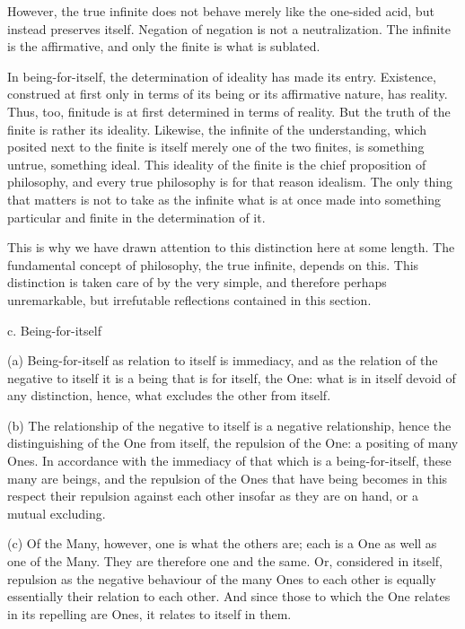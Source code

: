     However, the true infinite does not behave merely like
    the one-sided acid, but instead preserves itself.
    Negation of negation is not a neutralization.
    The infinite is the affirmative,
    and only the finite is what is sublated.

    In being-for-itself, the determination of
    ideality has made its entry.
    Existence, construed at first only
    in terms of its being or
    its affirmative nature, has reality.
    Thus, too, finitude is at first
    determined in terms of reality.
    But the truth of the finite is rather its ideality.
    Likewise, the infinite of the understanding,
    which posited next to the finite is
    itself merely one of the two finites,
    is something untrue, something ideal.
    This ideality of the finite is the
    chief proposition of philosophy,
    and every true philosophy is
    for that reason idealism.
    The only thing that matters is not to take as the infinite
    what is at once made into something particular and finite
    in the determination of it.

    This is why we have drawn attention to
    this distinction here at some length.
    The fundamental concept of philosophy,
    the true infinite, depends on this.
    This distinction is taken care of
    by the very simple, and therefore perhaps unremarkable,
    but irrefutable reflections contained in this section.

c. Being-for-itself

(a) Being-for-itself as relation to itself is immediacy,
and as the relation of the negative to itself
it is a being that is for itself, the One:
what is in itself devoid of any distinction,
hence, what excludes the other from itself.

(b) The relationship of the negative to itself is
a negative relationship,
hence the distinguishing of the One from itself,
the repulsion of the One: a positing of many Ones.
In accordance with the immediacy of
that which is a being-for-itself,
these many are beings, and
the repulsion of the Ones that have being
becomes in this respect their repulsion against each other
insofar as they are on hand, or a mutual excluding.

(c) Of the Many, however, one is what the others are;
each is a One as well as one of the Many.
They are therefore one and the same.
Or, considered in itself, repulsion as
the negative behaviour of the many Ones
to each other is equally essentially
their relation to each other.
And since those to which the One relates
in its repelling are Ones,
it relates to itself in them.


